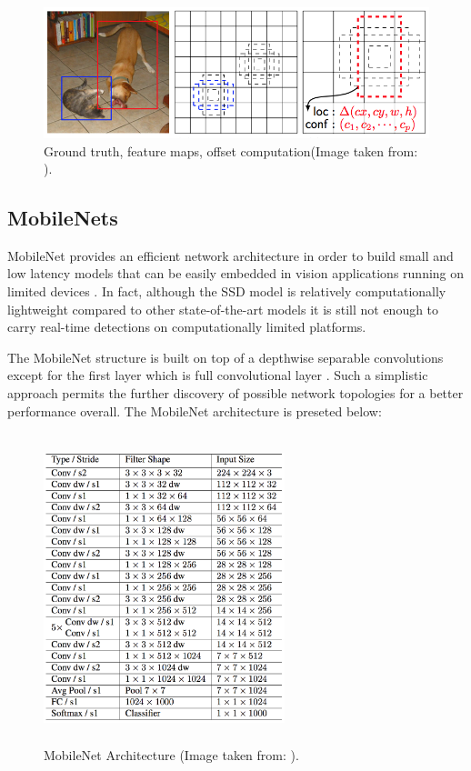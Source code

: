 \begin{figure}[!htbp]
\begin{center}
\includegraphics[width=\linewidth]{images/gt_boxes.png}
\end{center}
\caption{Ground truth, feature maps, offset computation(Image taken from: \cite{paper:SSD}).}
\label{fig:ssdGT}
\end{figure}

\subsection{MobileNets}

MobileNet provides an efficient network architecture in order to build small and low latency models that can be easily embedded in vision applications running on limited devices \cite{paper:MobileNets}. In fact, although the SSD model is relatively computationally lightweight compared to other state-of-the-art models it is still not enough to carry real-time detections on computationally limited platforms.

The MobileNet structure is built on top of a depthwise separable convolutions except for the first layer which is full convolutional layer \cite{paper:MobileNets}. Such a simplistic approach permits the further discovery of possible network topologies for a better performance overall. The MobileNet architecture is preseted below:

\begin{figure}[!htbp]
\begin{center}
\includegraphics[width=7cm,height=9cm,keepaspectratio]{images/mobileNet_structure.png}
\end{center}
\caption{MobileNet Architecture (Image taken from: \cite{paper:MobileNets}).}
\end{figure}

